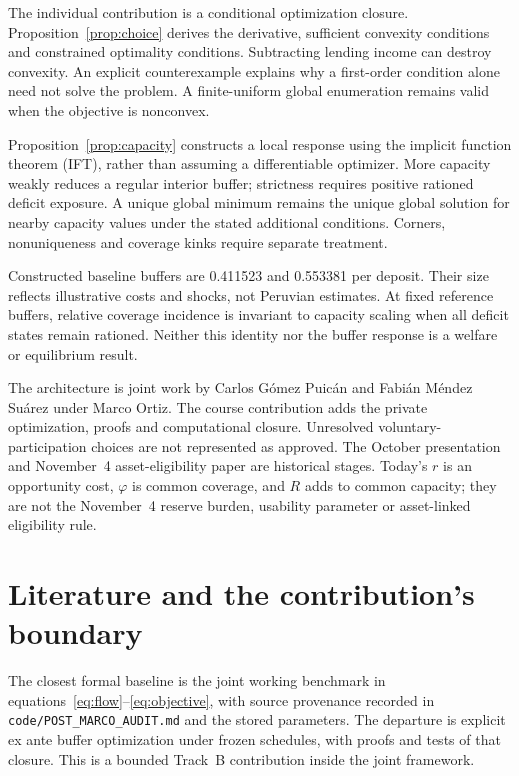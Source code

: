 \documentclass[11pt]{article}
\theoremstyle{definition}
\begin{document}
The individual contribution is a conditional optimization closure. Proposition~\ref{prop:choice} derives the derivative, sufficient convexity conditions and constrained optimality conditions. Subtracting lending income can destroy convexity. An explicit counterexample explains why a first-order condition alone need not solve the problem. A finite-uniform global enumeration remains valid when the objective is nonconvex.

Proposition~\ref{prop:capacity} constructs a local response using the implicit function theorem (IFT), rather than assuming a differentiable optimizer. More capacity weakly reduces a regular interior buffer; strictness requires positive rationed deficit exposure. A unique global minimum remains the unique global solution for nearby capacity values under the stated additional conditions. Corners, nonuniqueness and coverage kinks require separate treatment.

Constructed baseline buffers are 0.411523 and 0.553381 per deposit. Their size reflects illustrative costs and shocks, not Peruvian estimates. At fixed reference buffers, relative coverage incidence is invariant to capacity scaling when all deficit states remain rationed. Neither this identity nor the buffer response is a welfare or equilibrium result.

The architecture is joint work by Carlos G\'omez Puic\'an and Fabi\'an M\'endez Su\'arez under Marco Ortiz. The course contribution adds the private optimization, proofs and computational closure. Unresolved voluntary-participation choices are not represented as approved. The October presentation and November~4 asset-eligibility paper are historical stages. Today's $r$ is an opportunity cost, $\varphi$ is common coverage, and $R$ adds to common capacity; they are not the November~4 reserve burden, usability parameter or asset-linked eligibility rule.

\section{Literature and the contribution's boundary}
The closest formal baseline is the joint working benchmark in equations~\eqref{eq:flow}--\eqref{eq:objective}, with source provenance recorded in \texttt{code/POST\_MARCO\_AUDIT.md} and the stored parameters. The departure is explicit ex ante buffer optimization under frozen schedules, with proofs and tests of that closure. This is a bounded Track~B contribution inside the joint framework.
\end{document}
